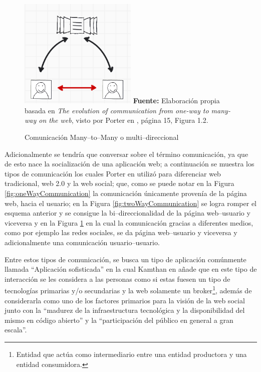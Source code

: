 \documentclass[oneside,12pt,a4paper]{memoir}%
\begin{document}
		\begin{figure}[here]
			\centering
			\caption{Comunicaci\'on Many--to--Many o multi--direccional}
			\includegraphics[width=0.5\textwidth]{figure/fig_manywayCommunication.PNG}
			\newline
			\textbf{Fuente:} Elaboraci\'on propia basada en \textit{The evolution of
			communication from one-way to many-way on the web}, visto por Porter en
			\cite{Porter2008}, p\'agina 15, Figura 1.2.
			\label{fig:ManyWayCommunication}
		\end{figure}
	 
		Adicionalmente se tendr\'ia que conversar sobre el t\'ermino
		comunicaci\'on, ya que de esto nace la socializaci\'on de una aplicaci\'on
		web; a continuaci\'on se muestra los tipos de comunicaci\'on los cuales Porter
		en \cite{Porter2008} utiliz\'o para diferenciar web tradicional, web 2.0 y la
		web social; que, como se puede notar en la Figura
		\ref{fig:oneWayCommunication} la comunicaci\'on \'unicamente proven\'ia de la
		p\'agina web, hacia el usuario; en la Figura \ref{fig:twoWayCommunication} se
		logra romper el esquema anterior y se consigue la bi--direccionalidad de la
		p\'agina web--usuario y viceversa y en la Figura 
		\ref{fig:ManyWayCommunication} en la cual la comunicaci\'on gracias a
		diferentes medios, como por ejemplo las redes sociales, se da p\'agina
		web--usuario y viceversa y adicionalmente una comunicaci\'on usuario--usuario.
		
		Entre estos tipos de comunicaci\'on, se busca un tipo de aplicaci\'on
		com\'unmente llamada ``Aplicaci\'on sofisticada'' en la cual Kamthan en
		\cite{Kamthan2009} a\~nade que en este tipo de interacci\'on se les considera
		a las personas como si estas fuesen un tipo de tecnolog\'ias primarias y/o
		secundarias y la web solamente un broker\footnote{Entidad que act\'ua como
		intermediario entre una entidad productora y una entidad consumidora.},
		adem\'as de considerarla como uno de los factores primarios para la visi\'on
		de la web social junto con la ``madurez de la infraestructura
		tecnol\'ogica y la disponibilidad del mismo en c\'odigo abierto'' y la
		``participaci\'on del p\'ublico en general a gran escala''.
		
\end{document}

